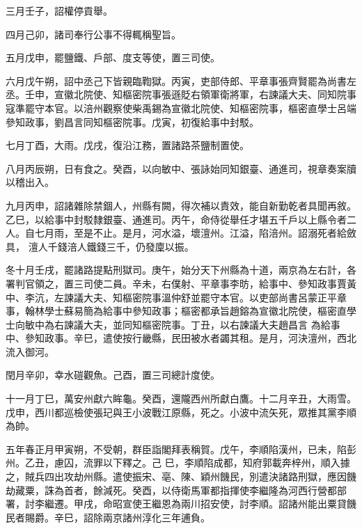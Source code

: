 \begin{pinyinscope}
 三月壬子，詔權停貢舉。



 四月己卯，諸司奉行公事不得輒稱聖旨。



 五月戊申，罷鹽鐵、戶部、度支等使，置三司使。



 六月戊午朔，詔中丞己下皆親臨鞫獄。丙寅，吏部侍郎、平章事張齊賢罷為尚書左丞。壬申，宣徽北院使、知樞密院事張遜貶右領軍衛將軍，右諫議大夫、同知院事寇準罷守本官。以涪州觀察使柴禹錫為宣徽北院使、知樞密院事，樞密直學士呂端
 參知政事，劉昌言同知樞密院事。戊寅，初復給事中封駁。



 七月丁酉，大雨。戊戌，復沿江務，置諸路茶鹽制置使。



 八月丙辰朔，日有食之。癸酉，以向敏中、張詠始同知銀臺、通進司，視章奏案牘以稽出入。



 九月丙申，詔諸雜除禁錮人，州縣有闕，得次補以責效，能自新勤乾者具聞再敘。乙巳，以給事中封駁隸銀臺、通進司。丙午，命侍從舉任才堪五千戶以上縣令者二人。自七月雨，至是不止。是月，河水溢，壞澶州。江溢，陷涪州。詔溺死者給斂具，
 澶人千錢涪人鐵錢三千，仍發廩以振。



 冬十月壬戌，罷諸路提點刑獄司。庚午，始分天下州縣為十道，兩京為左右計，各署判官領之，置三司使二員。辛未，右僕射、平章事李昉，給事中、參知政事賈黃中、李沆，左諫議大夫、知樞密院事溫仲舒並罷守本官。以吏部尚書呂蒙正平章事，翰林學士蘇易簡為給事中參知政事；樞密都承旨趙鎔為宣徽北院使，樞密直學士向敏中為右諫議大夫，並同知樞密院事。丁丑，以右諫議大夫趙昌言
 為給事中、參知政事。辛巳，遣使按行畿縣，民田被水者蠲其租。是月，河決澶州，西北流入御河。



 閏月辛卯，幸水磑觀魚。己酉，置三司總計度使。



 十一月丁巳，萬安州獻六眸龜。癸酉，還隴西州所獻白鷹。十二月辛丑，大雨雪。戊申，西川都巡檢使張玘與王小波戰江原縣，死之。小波中流矢死，眾推其黨李順為帥。



 五年春正月甲寅朔，不受朝，群臣詣閣拜表稱賀。戊午，李順陷漢州，已未，陷彭州。乙丑，慮囚，流罪以下釋之。己
 巳，李順陷成都，知府郭載奔梓州，順入據之，賊兵四出攻劫州縣。遣使振宋、亳、陳、穎州饑民，別遣決諸路刑獄，應因饑劫藏粟，誅為首者，餘減死。癸酉，以侍衛馬軍都指揮使李繼隆為河西行營都部署，討李繼遷。甲戌，命昭宣使王繼恩為兩川招安使，討李順。詔諸州能出粟貸饑民者賜爵。辛巳，詔除兩京諸州淳化三年逋負。




\end{pinyinscope}
